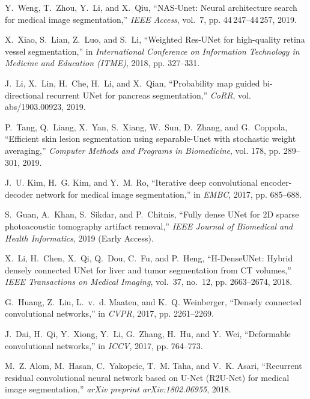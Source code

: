 \documentclass[10pt,twocolumn,letterpaper]{article}
\begin{document}
{\begin{thebibliography}{10}
	Y.~{Weng}, T.~{Zhou}, Y.~{Li}, and X.~{Qiu}, ``{NAS-Unet}: Neural architecture
	search for medical image segmentation,'' \emph{IEEE Access}, vol.~7, pp.
	44\,247--44\,257, 2019.
	
	X.~{Xiao}, S.~{Lian}, Z.~{Luo}, and S.~{Li}, ``Weighted {Res-UNet} for
	high-quality retina vessel segmentation,'' in \emph{International Conference
		on Information Technology in Medicine and Education (ITME)}, 2018, pp.
	327--331.
	
	J.~Li, X.~Lin, H.~Che, H.~Li, and X.~Qian, ``Probability map guided
	bi-directional recurrent {UNet} for pancreas segmentation,'' \emph{CoRR},
	vol. abs/1903.00923, 2019.
	
	P.~Tang, Q.~Liang, X.~Yan, S.~Xiang, W.~Sun, D.~Zhang, and G.~Coppola,
	``Efficient skin lesion segmentation using {separable-Unet} with stochastic
	weight averaging,'' \emph{Computer Methods and Programs in Biomedicine}, vol.
	178, pp. 289--301, 2019.
	
	J.~U. {Kim}, H.~G. {Kim}, and Y.~M. {Ro}, ``Iterative deep convolutional
	encoder-decoder network for medical image segmentation,'' in \emph{EMBC},
	2017, pp. 685--688.
	
	S.~{Guan}, A.~{Khan}, S.~{Sikdar}, and P.~{Chitnis}, ``Fully dense {UNet} for
	{2D} sparse photoacoustic tomography artifact removal,'' \emph{IEEE Journal
		of Biomedical and Health Informatics}, 2019 (Early Access).
	
	X.~{Li}, H.~{Chen}, X.~{Qi}, Q.~{Dou}, C.~{Fu}, and P.~{Heng}, ``{H-DenseUNet}:
	Hybrid densely connected {UNet} for liver and tumor segmentation from {CT}
	volumes,'' \emph{IEEE Transactions on Medical Imaging}, vol.~37, no.~12, pp.
	2663--2674, 2018.
	
	G.~{Huang}, Z.~{Liu}, L.~v.~d. {Maaten}, and K.~Q. {Weinberger}, ``Densely
	connected convolutional networks,'' in \emph{CVPR}, 2017, pp. 2261--2269.
	
	J.~Dai, H.~Qi, Y.~Xiong, Y.~Li, G.~Zhang, H.~Hu, and Y.~Wei, ``Deformable
	convolutional networks,'' in \emph{ICCV}, 2017, pp. 764--773.
	
	M.~Z. Alom, M.~Hasan, C.~Yakopcic, T.~M. Taha, and V.~K. Asari, ``Recurrent
	residual convolutional neural network based on {U-Net} ({R2U-Net}) for
	medical image segmentation,'' \emph{arXiv preprint arXiv:1802.06955}, 2018.
	

\end{thebibliography}}
\end{document}
